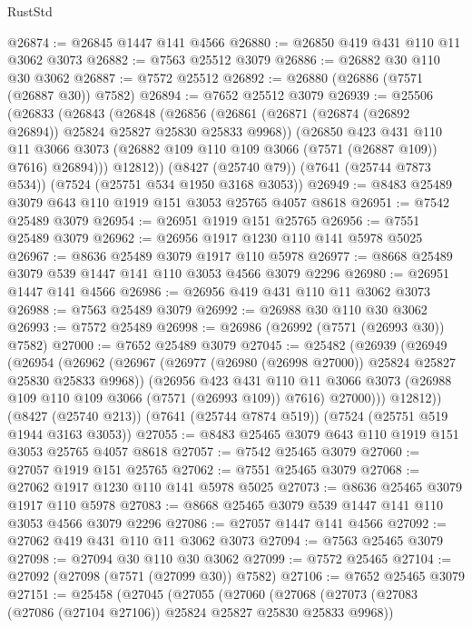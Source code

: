 \begin{lexlean}{RustStd}
\begin{coremodule}
@26874 := @26845 @1447 @141 @4566
@26880 := @26850 @419 @431 @110 @11 @3062 @3073
@26882 := @7563 @25512 @3079
@26886 := @26882 @30 @110 @30 @3062
@26887 := @7572 @25512
@26892 := @26880 (@26886 (@7571 (@26887 @30)) @7582)
@26894 := @7652 @25512 @3079
@26939 := @25506
    (@26833
      (@26843
        (@26848
          (@26856
            (@26861 (@26871 (@26874 (@26892 @26894)) @25824 @25827 @25830 @25833 @9968))
            (@26850
              @423
              @431
              @110
              @11
              @3066
              @3073
              (@26882 @109 @110 @109 @3066 (@7571 (@26887 @109)) @7616)
              @26894)))
        @12812))
    (@8427 (@25740 @79))
    (@7641 (@25744 @7873 @534))
    (@7524 (@25751 @534 @1950 @3168 @3053))
@26949 := @8483 @25489 @3079 @643 @110 @1919 @151 @3053 @25765 @4057 @8618
@26951 := @7542 @25489 @3079
@26954 := @26951 @1919 @151 @25765
@26956 := @7551 @25489 @3079
@26962 := @26956 @1917 @1230 @110 @141 @5978 @5025
@26967 := @8636 @25489 @3079 @1917 @110 @5978
@26977 := @8668 @25489 @3079 @539 @1447 @141 @110 @3053 @4566 @3079 @2296
@26980 := @26951 @1447 @141 @4566
@26986 := @26956 @419 @431 @110 @11 @3062 @3073
@26988 := @7563 @25489 @3079
@26992 := @26988 @30 @110 @30 @3062
@26993 := @7572 @25489
@26998 := @26986 (@26992 (@7571 (@26993 @30)) @7582)
@27000 := @7652 @25489 @3079
@27045 := @25482
    (@26939
      (@26949
        (@26954
          (@26962
            (@26967 (@26977 (@26980 (@26998 @27000)) @25824 @25827 @25830 @25833 @9968))
            (@26956
              @423
              @431
              @110
              @11
              @3066
              @3073
              (@26988 @109 @110 @109 @3066 (@7571 (@26993 @109)) @7616)
              @27000)))
        @12812))
    (@8427 (@25740 @213))
    (@7641 (@25744 @7874 @519))
    (@7524 (@25751 @519 @1944 @3163 @3053))
@27055 := @8483 @25465 @3079 @643 @110 @1919 @151 @3053 @25765 @4057 @8618
@27057 := @7542 @25465 @3079
@27060 := @27057 @1919 @151 @25765
@27062 := @7551 @25465 @3079
@27068 := @27062 @1917 @1230 @110 @141 @5978 @5025
@27073 := @8636 @25465 @3079 @1917 @110 @5978
@27083 := @8668 @25465 @3079 @539 @1447 @141 @110 @3053 @4566 @3079 @2296
@27086 := @27057 @1447 @141 @4566
@27092 := @27062 @419 @431 @110 @11 @3062 @3073
@27094 := @7563 @25465 @3079
@27098 := @27094 @30 @110 @30 @3062
@27099 := @7572 @25465
@27104 := @27092 (@27098 (@7571 (@27099 @30)) @7582)
@27106 := @7652 @25465 @3079
@27151 := @25458
    (@27045
      (@27055
        (@27060
          (@27068
            (@27073 (@27083 (@27086 (@27104 @27106)) @25824 @25827 @25830 @25833 @9968))

\end{coremodule}
\end{lexlean}
